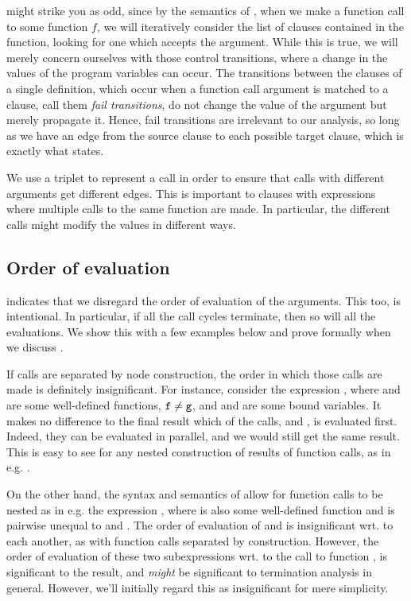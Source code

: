  might strike you as odd, since by
the semantics of \D{}, when we make a function call to some function $f$, we
will iteratively consider the list of clauses contained in the function,
looking for one which accepts the argument. While this is true, we will merely
concern ourselves with those control transitions, where a change in the values
of the program variables can occur. The transitions between the clauses of a
single definition, which occur when a function call argument is matched to a
clause, call them \emph{fail transitions}, do not change the value of the
argument but merely propagate it.  Hence, fail transitions are irrelevant to
our analysis, so long as we have an edge from the source clause to each
possible target clause, which is exactly what
 states.

We use a triplet to represent a call in order to ensure that calls with
different arguments get different edges. This is important to clauses with
expressions where multiple calls to the same function are made. In particular,
the different calls might modify the values in different ways.

\subsection{Order of evaluation}

 indicates that we disregard the
order of evaluation of the arguments. This too, is intentional.  In particular,
if all the call cycles terminate, then so will all the evaluations. We show
this with a few examples below and prove formally when we discuss
.

If calls are separated by node construction, the order in which those calls are
made is definitely insignificant. For instance, consider the expression
, where  and  are some well-defined
functions, $\text{{\ttfamily f}}\neq\text{{\ttfamily g}}$, and  and  are
some bound variables. It makes no difference to the final result which of the
calls,  and , is evaluated first. Indeed, they can be
evaluated in parallel, and we would still get the same result. This is easy to
see for any nested construction of results of function calls, as in e.g.
.

On the other hand, the syntax and semantics of \D{} allow for function calls to
be nested as in e.g. the expression , where  is
also some well-defined function and is pairwise unequal to  and
. The order of evaluation of  and  is
insignificant wrt. to each another, as with function calls separated by
construction. However, the order of evaluation of these two subexpressions wrt.
to the call to function , is significant to the result, and
\emph{might} be significant to termination analysis in general. However, we'll
initially regard this as insignificant for mere simplicity.

